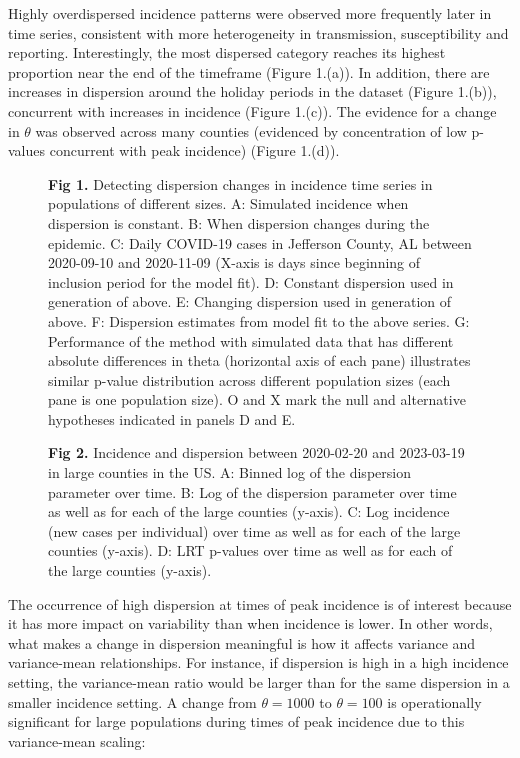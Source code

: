 \documentclass[10pt,letterpaper]{article}
\begin{document}
Highly overdispersed incidence patterns were observed more frequently later in time series, consistent with more heterogeneity in transmission, susceptibility and reporting. 
Interestingly, the most dispersed category reaches its highest proportion near the end of the timeframe (Figure 1.(a)).
In addition, there are increases in dispersion around the holiday periods in the dataset (Figure 1.(b)), concurrent with increases in incidence (Figure 1.(c)). 
The evidence for a change in \begin{math}\theta\end{math} was observed across many counties (evidenced by concentration of low p-values concurrent with peak incidence) (Figure 1.(d)).

\begin{figure}[!h]
\caption{{\bf Fig 1.}
Detecting dispersion changes in incidence time series in populations of different sizes. A: Simulated incidence when dispersion is constant. B: When dispersion changes during the epidemic. C: Daily COVID-19 cases in Jefferson County, AL between 2020-09-10 and 2020-11-09 (X-axis is days since beginning of inclusion period for the model fit). D: Constant dispersion used in generation of above. E: Changing dispersion used in generation of above. F: Dispersion estimates from model fit to the above series. G: Performance of the method with simulated data that has different absolute differences in theta (horizontal axis of each pane) illustrates similar p-value distribution across different population sizes (each pane is one population size). O and X mark the null and alternative hypotheses indicated in panels D and E. 
 }
\label{fig1}
\end{figure}

\begin{figure}[!h]
\caption{{\bf Fig 2.}
Incidence and dispersion between 2020-02-20 and 2023-03-19 in large counties in the US. A: Binned log of the dispersion parameter over time. B: Log of the dispersion parameter over time as well as for each of the large counties (y-axis). C: Log incidence (new cases per individual) over time as well as for each of the large counties (y-axis). D: LRT p-values over time as well as for each of the large counties (y-axis).
}
\label{fig2}
\end{figure}

The occurrence of high dispersion at times of peak incidence is of interest because it has more impact on variability than when incidence is lower. 
In other words, what makes a change in dispersion meaningful is how it affects variance and variance-mean relationships. 
For instance, if dispersion is high in a high incidence setting, the variance-mean ratio would be larger than for the same dispersion in a smaller incidence setting. 
A change from \begin{math}\theta = 1000\end{math} to \begin{math}\theta = 100\end{math} is operationally significant for large populations during times of peak incidence due to this variance-mean scaling:
\end{document}
